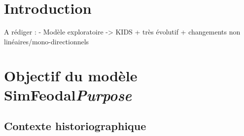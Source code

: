 \clearpage


\section*{Introduction}
\label{sec:chap2-intro}

A rédiger :
- Modèle exploratoire -> KIDS + très évolutif + changements non linéaires/mono-directionnels


\section[Objectifs du modèle SimFeodal --  \textit{Purpose}]{Objectif du modèle SimFeodal\protect\newline \large{\textit{Purpose}}}


\subsection{Contexte historiographique}

